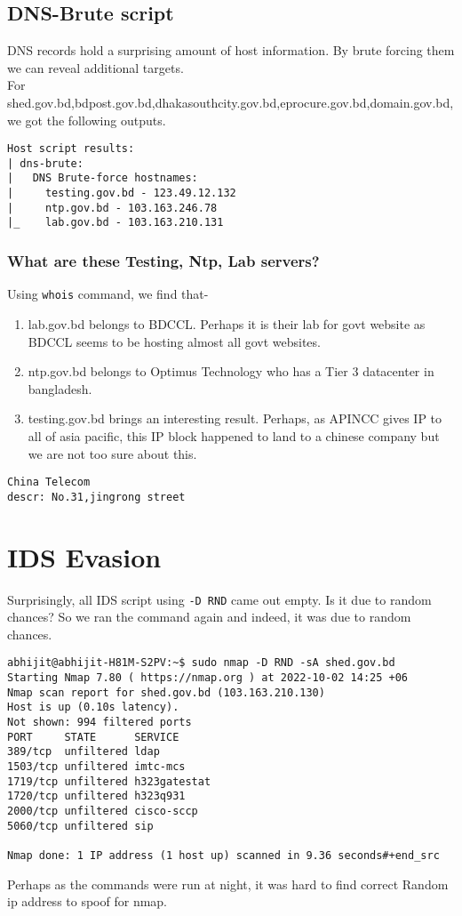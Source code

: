 \documentclass[11pt]{article}
\begin{document}
\subsection{DNS-Brute script}
\label{sec:orgadd3a9d}
DNS records hold a surprising amount of host information. By brute forcing them we can reveal additional targets.\\

For shed.gov.bd,bdpost.gov.bd,dhakasouthcity.gov.bd,eprocure.gov.bd,domain.gov.bd, we got the following outputs.\\
\begin{verbatim}
Host script results:
| dns-brute: 
|   DNS Brute-force hostnames: 
|     testing.gov.bd - 123.49.12.132
|     ntp.gov.bd - 103.163.246.78
|_    lab.gov.bd - 103.163.210.131
\end{verbatim}
\subsubsection{What are these Testing, Ntp, Lab servers?}
\label{sec:org751afad}
Using \texttt{whois} command, we find that-\\
\begin{enumerate}
\item lab.gov.bd belongs to BDCCL. Perhaps it is their lab for govt website as BDCCL seems to be hosting almost all govt websites.\\
\item ntp.gov.bd belongs to Optimus Technology who has a Tier 3 datacenter in bangladesh.\\
\item testing.gov.bd brings an interesting result. Perhaps, as APINCC gives IP to all of asia pacific, this IP block happened to land to a chinese company but we are not too sure about this.\\
\end{enumerate}
\begin{verbatim}
China Telecom
descr: No.31,jingrong street
\end{verbatim}
\section{IDS Evasion}
\label{sec:org4c7c019}
Surprisingly, all IDS script using \texttt{-D RND} came out empty. Is it due to random chances? So we ran the command again and indeed, it was due to random chances.\\
\begin{verbatim}
abhijit@abhijit-H81M-S2PV:~$ sudo nmap -D RND -sA shed.gov.bd
Starting Nmap 7.80 ( https://nmap.org ) at 2022-10-02 14:25 +06
Nmap scan report for shed.gov.bd (103.163.210.130)
Host is up (0.10s latency).
Not shown: 994 filtered ports
PORT     STATE      SERVICE
389/tcp  unfiltered ldap
1503/tcp unfiltered imtc-mcs
1719/tcp unfiltered h323gatestat
1720/tcp unfiltered h323q931
2000/tcp unfiltered cisco-sccp
5060/tcp unfiltered sip

Nmap done: 1 IP address (1 host up) scanned in 9.36 seconds#+end_src
\end{verbatim}
Perhaps as the commands were run at night, it was hard to find correct Random ip address to spoof for nmap.\\
\end{document}
